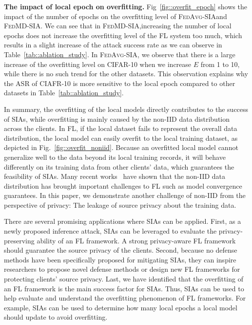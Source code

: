 \documentclass[10pt,journal,compsoc]{IEEEtran}
\newcommand*\fedavg{\textsc{FedAvg-SIA}}
\newcommand*\fedmd{\textsc{FedMD-SIA}}
\begin{document}
\noindent \textbf{The impact of local epoch on overfitting. \;} Fig~\ref{fig::overfit_epoch} shows the impact of the number of epochs on the overfitting level of \fedavg \;and \fedmd. We can see that in \fedmd,\;increasing the number of local epochs does not increase the overfitting level of the FL system too much, which results in a slight increase of the attack success rate as we can observe in Table~\ref{tab::ablation_study}. In \fedavg, \;we observe that there is a large increase of the overfitting level on CIFAR-10 when we increase $E$ from 1 to 10, while there is no such trend for the other datasets. This observation explains why the ASR of CIAFR-10 is more sensitive to the local epoch compared to other datasets in Table~\ref{tab::ablation_study}. 


In summary, the overfitting of the local models directly contributes to the success of SIAs, while overfitting is mainly caused by the non-IID data distribution across the clients. In FL, if the local dataset fails to represent the overall data distribution, the local model can easily overfit to the local training dataset, as depicted in Fig.~\ref{fig::overfit_noniid}. Because an overfitted local model cannot generalize well to the data beyond its local training records, it will behave differently on its training data from other clients' data, which guarantees the feasibility of SIAs. Many recent works~\cite{zhao2018federated,li2019convergence,li2020federated,li2020fedprox,lin2020ensemble} have shown that the non-IID data distribution has brought important challenges to FL such as model convergence guarantees. In this paper, we demonstrate another challenge of non-IID from the perspective of privacy: The leakage of source privacy about the training data.

{There are several promising applications where SIAs can be applied. First, as a newly proposed inference attack, SIAs can be leveraged to evaluate the privacy-preserving ability of an FL framework. A strong privacy-aware FL framework should guarantee the source privacy of the clients. Second, because no defense methods have been specifically proposed for mitigating SIAs, they can inspire researchers to propose novel defense methods or design new FL frameworks for protecting clients' source privacy. Last, we have identified that the overfitting of an FL framework is the main success factor for SIAs. Thus, SIAs can be used to help evaluate and understand the overfitting phenomenon of FL frameworks. For example, SIAs can be used to determine how many local epochs a local model should update to avoid overfitting.}
\end{document}
